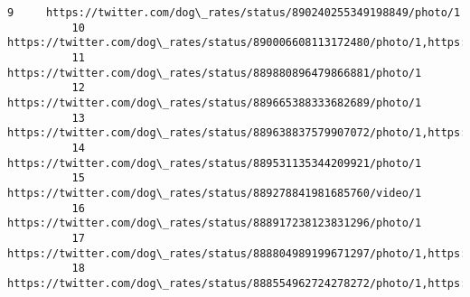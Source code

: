 \documentclass[11pt]{article}
\begin{document}
\begin{Verbatim}[commandchars=\\\{\}]
          9     https://twitter.com/dog\_rates/status/890240255349198849/photo/1                                                                                                                                                                                                   
          10    https://twitter.com/dog\_rates/status/890006608113172480/photo/1,https://twitter.com/dog\_rates/status/890006608113172480/photo/1                                                                                                                                   
          11    https://twitter.com/dog\_rates/status/889880896479866881/photo/1                                                                                                                                                                                                   
          12    https://twitter.com/dog\_rates/status/889665388333682689/photo/1                                                                                                                                                                                                   
          13    https://twitter.com/dog\_rates/status/889638837579907072/photo/1,https://twitter.com/dog\_rates/status/889638837579907072/photo/1                                                                                                                                   
          14    https://twitter.com/dog\_rates/status/889531135344209921/photo/1                                                                                                                                                                                                   
          15    https://twitter.com/dog\_rates/status/889278841981685760/video/1                                                                                                                                                                                                   
          16    https://twitter.com/dog\_rates/status/888917238123831296/photo/1                                                                                                                                                                                                   
          17    https://twitter.com/dog\_rates/status/888804989199671297/photo/1,https://twitter.com/dog\_rates/status/888804989199671297/photo/1                                                                                                                                   
          18    https://twitter.com/dog\_rates/status/888554962724278272/photo/1,https://twitter.com/dog\_rates/status/888554962724278272/photo/1,https://twitter.com/dog\_rates/status/888554962724278272/photo/1,https://twitter.com/dog\_rates/status/888554962724278272/photo/1   

\end{Verbatim}
\end{document}
